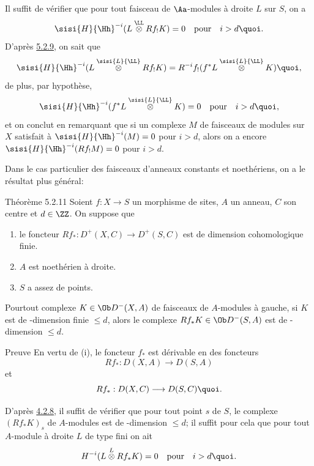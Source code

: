 \documentclass[10pt]{../fichiers-configuration-latex/smfart}
\begin{document}
Il suffit de vérifier que pour tout faisceau de $\Aa$-modules
à droite $L$ sur $S$, on a
\[
\sisi{H}{\Hh}^{-i} (L\overset{\LL}{\otimes}Rf_{!}K)=0\quad\mbox{\rm
pour}\quad i>d{\quoi}.
\]
D'après \hyperref[XVII.prop5.2.9]{5.2.9}, on sait que
\[
\sisi{H}{\Hh}^{-i}(L\overset{\sisi{L}{\LL}}{\otimes}Rf_{!}K)=R^{-i}f_{!}(f^{\ast}L\overset{\sisi{L}{\LL}}{\otimes}K){\quoi},
\]
de plus, par hypothèse,
\[
\sisi{H}{\Hh}^{-i}(f^{\ast}L\overset{\sisi{L}{\LL}}{\otimes}K)=0\quad\mbox{\rm pour}\quad
i>d{\quoi},
\]
et on conclut en remarquant que si un complexe $M$ de faisceaux de
modules sur $X$ satisfait à $\sisi{H}{\Hh}^{-i}(M)=0$ pour $i>d$, alors on a
encore $\sisi{H}{\Hh}^{-i}(Rf_{!}M)=0$ pour $i>d$.

Dans le cas particulier des faisceaux d'anneaux constants et
noethériens, on a le résultat plus général:

\begin{enonce*}{Théorème 5.2.11}
Soient $f:X\rightarrow S$ un morphisme de sites, $A$ un anneau, $C$
son centre et $d\in\ZZ$. On suppose que
\begin{enumerate}
\renewcommand{\theenumi}{\roman{enumi}}
\renewcommand{\labelenumi}{(\theenumi)}
\item le foncteur $Rf_{\ast}:D^{+}(X,C)\rightarrow D^{+}(S,C)$ est de
dimension cohomologique finie.

\item $A$ est noethérien à droite.

\item $S$ a assez de points.
\end{enumerate}
Pour\pageoriginale tout complexe $K\in \Ob D^{-}(X,A)$ de faisceaux de
$A$-modules à gauche, si $K$ est de \tTor-dimension finie $\leq d$,
alors le complexe $Rf_{\ast}K\in \Ob D^{-}(S,A)$ est de \tTor-dimension
$\leq d$.
\end{enonce*}

\begin{enonce*}[remark]{Preuve}
En vertu de (i), le foncteur $f_{\ast}$ est dérivable en des foncteurs
\[
Rf_{\ast}:D(X,A)\longrightarrow D(S,A)
\]
et
\[
Rf_{\ast}:D(X,C)\longrightarrow D(S,C){\quoi}.
\]
\end{enonce*}

D'après \hyperref[XVII.lem4.2.8]{4.2.8}, il suffit de vérifier que pour tout point $s$ de $S$,
le complexe $(Rf_{\ast}K)_s$ de $A$-modules est de \tTor-dimension $\leq
d$; il suffit pour cela que pour tout $A$-module à droite $L$ de type
fini on ait
\[
H^{-i}(L\overset{L}{\otimes}Rf_{\ast}K)=0\quad\mbox{\rm pour}\quad
i>d{\quoi}.
\]
\end{document}
